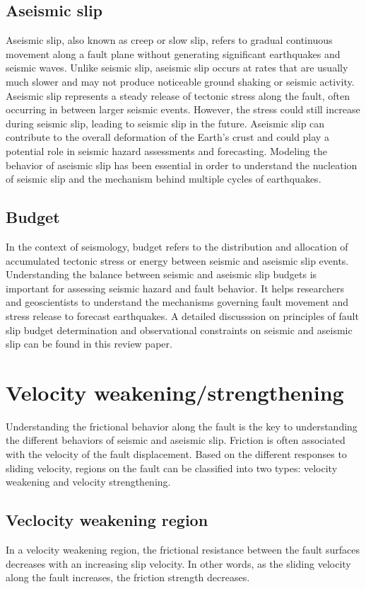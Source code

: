 \subsection{Aseismic slip}
Aseismic slip, also known as creep or slow slip, refers to gradual continuous movement along a fault plane without generating significant earthquakes and seismic waves.
Unlike seismic slip, aseismic slip occurs at rates that are usually much slower and may not produce noticeable ground shaking or seismic activity.
Aseismic slip represents a steady release of tectonic stress along the fault, often occurring in between larger seismic events.
However, the stress could still increase during seismic slip, leading to seismic slip in the future.
Aseismic slip can contribute to the overall deformation of the Earth's crust and could play a potential role in seismic hazard assessments and forecasting.
Modeling the behavior of aseismic slip has been essential in order to understand the nucleation of seismic slip and the mechanism behind multiple cycles of earthquakes.

\subsection{Budget}
In the context of seismology, budget refers to the distribution and allocation of accumulated tectonic stress or energy between seismic and aseismic slip events.
Understanding the balance between seismic and aseismic slip budgets is important for assessing seismic hazard and fault behavior.
It helps researchers and geoscientists to understand the mechanisms governing fault movement and stress release to forecast earthquakes. A detailed discusssion on principles of fault slip budget determination and observational constraints on seismic and aseismic slip can be found in this review paper\cite{annurev:/content/journals/10.1146/annurev-earth-060614-105302}.


\section{Velocity weakening/strengthening}
Understanding the frictional behavior along the fault is the key to understanding the different behaviors of seismic and aseismic slip.
Friction is often associated with the velocity of the fault displacement.
Based on the different responses to sliding velocity, regions on the fault can be classified into two types: velocity weakening and velocity strengthening.
\subsection{Veclocity weakening region}
In a velocity weakening region, the frictional resistance between the fault surfaces decreases with an increasing slip velocity.
In other words, as the sliding velocity along the fault increases, the friction strength decreases.

